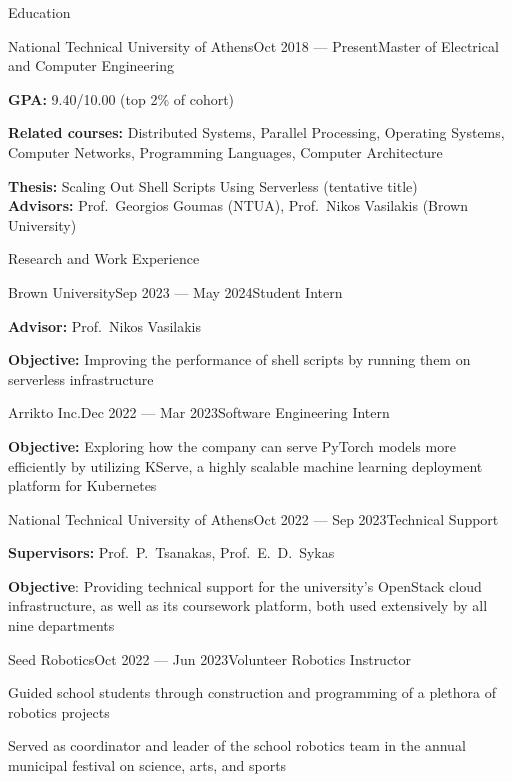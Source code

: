 \documentclass[letterpaper, 11pt]{resume}
\begin{document}
\begin{rSection}{Education}
    \begin{rSubsection}{National Technical University of Athens}{Oct 2018 --- Present}{Master of Electrical and Computer Engineering}{}
        \item \textbf{GPA:} 9.40/10.00 (top 2\% of cohort)
        \item \textbf{Related courses:} Distributed Systems, Parallel Processing, Operating Systems, Computer Networks, Programming Languages, Computer Architecture
        \item \textbf{Thesis:} Scaling Out Shell Scripts Using Serverless (tentative title) \\
        \textbf{Advisors:} Prof.\ Georgios Goumas (NTUA), Prof.\ Nikos Vasilakis (Brown University)
    \end{rSubsection}
\end{rSection}

\begin{rSection}{Research and Work Experience}
    \begin{rSubsection}{Brown University}{Sep 2023 --- May 2024}{Student Intern}{}
        \item \textbf{Advisor:} Prof.\ Nikos Vasilakis
        \item \textbf{Objective:} Improving the performance of shell scripts by running them on serverless infrastructure
    \end{rSubsection}

    \begin{rSubsection}{Arrikto Inc.}{Dec 2022 --- Mar 2023}{Software Engineering Intern}{}
        \item \textbf{Objective:} Exploring how the company can serve PyTorch models more efficiently by utilizing KServe, a highly scalable machine learning deployment platform for Kubernetes
    \end{rSubsection}

    \begin{rSubsection}{National Technical University of Athens}{Oct 2022 --- Sep 2023}{Technical Support}{}
        \item \textbf{Supervisors:} Prof.\ P.\ Tsanakas, Prof.\ E.\ D.\ Sykas
        \item \textbf{Objective}: Providing technical support for the university's OpenStack cloud infrastructure, as well as its coursework platform, both used extensively by all nine departments
    \end{rSubsection}

    \begin{rSubsection}{Seed Robotics}{Oct 2022 --- Jun 2023}{Volunteer Robotics Instructor}{}
        \item Guided school students through construction and programming of a plethora of robotics projects
        \item Served as coordinator and leader of the school robotics team in the annual municipal festival on science, arts, and sports
    \end{rSubsection}
\end{rSection}
\end{document}
